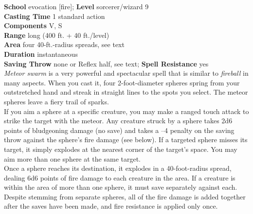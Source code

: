 \textbf{School }evocation [fire]; \textbf{Level }sorcerer/wizard 9\\
\textbf{Casting Time }1 standard action\\
\textbf{Components }V, S\\
\textbf{Range }long (400 ft. + 40 ft./level)\\
\textbf{Area }four 40-ft.-radius spreads, see text\\
\textbf{Duration }instantaneous\\
\textbf{Saving Throw} none or Reflex half, see text; \textbf{Spell Resistance} yes\\
\textit{Meteor swarm }is a very powerful and spectacular spell that is similar to \textit{fireball }in many aspects. When you cast it, four 2-foot-diameter spheres spring from your outstretched hand and streak in straight lines to the spots you select. The meteor spheres leave a fiery trail of sparks.\\
If you aim a sphere at a specific creature, you may make a ranged touch attack to strike the target with the meteor. Any creature struck by a sphere takes 2d6 points of bludgeoning damage (no save) and takes a --4 penalty on the saving throw against the sphere's fire damage (see below). If a targeted sphere misses its target, it simply explodes at the nearest corner of the target's space. You may aim more than one sphere at the same target.\\
Once a sphere reaches its destination, it explodes in a 40-foot-radius spread, dealing 6d6 points of fire damage to each creature in the area. If a creature is within the area of more than one sphere, it must save separately against each. Despite stemming from separate spheres, all of the fire damage is added together after the saves have been made, and fire resistance is applied only once.\\
